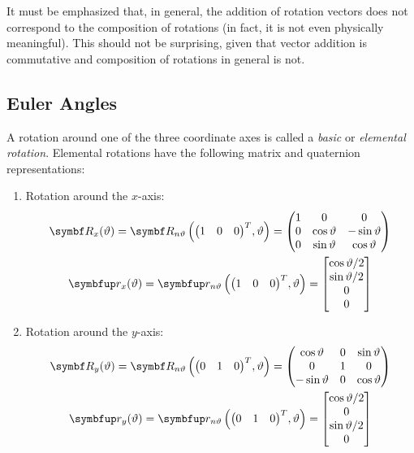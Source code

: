 It must be emphasized that, in general, the addition of rotation vectors does not correspond to the composition of rotations (in fact, it is not even physically meaningful). This should not be surprising, given that vector addition is commutative and composition of rotations in general is not.

\subsection{Euler Angles} \label{Euler Angles} %
A rotation around one of the three coordinate axes is called a \emph{basic} or \emph{elemental rotation}. Elemental rotations have the following matrix and quaternion representations:
\begin{enumerate}
\item Rotation around the $x$-axis:
\begin{subequations}
\begin{gather}
	\mat{\rotm_{x}}(\rotang) = \RotMAxAng{\tr{\matenv{1 & 0 & 0}}}{\rotang} = 
	\begin{pmatrix}
		1		&0		&0	\\
		0		&\cos \rotang	&-\sin \rotang\\
		0		&\sin \rotang		&\cos \rotang
	\end{pmatrix} \label{Eq:AttRep:ElemRot:X:RotM}
	\\
	\quat{\rotq}_{x}(\rotang) = \RotQAxAng{\tr{\matenv{1 & 0 & 0}}}{\rotang} = 
	\qcolcmp{\cos \rotang / 2}{\sin \rotang /2}{0}{0} \label{Eq:AttRep:ElemRot:X:RotQ}
\end{gather}
\end{subequations}

\item Rotation around the $y$-axis:
\begin{subequations}
\begin{gather}
	\mat{\rotm_{y}}(\rotang) = \RotMAxAng{\tr{\matenv{0 & 1 & 0}}}{\rotang} = 
	\begin{pmatrix}
		\cos \rotang	&0		&\sin \rotang	\\
		0		&1		&0\\
		-\sin \rotang	&0		&\cos \rotang
	\end{pmatrix} \label{Eq:AttRep:ElemRot:Y:RotM}
	\\
	\quat{\rotq}_{y}(\rotang) = \RotQAxAng{\tr{\matenv{0 & 1 & 0}}}{\rotang} = 
	\qcolcmp{\cos \rotang / 2}{0}{\sin \rotang /2}{0} \label{Eq:AttRep:ElemRot:Y:RotQ}
\end{gather}
\end{subequations}


\end{enumerate}

